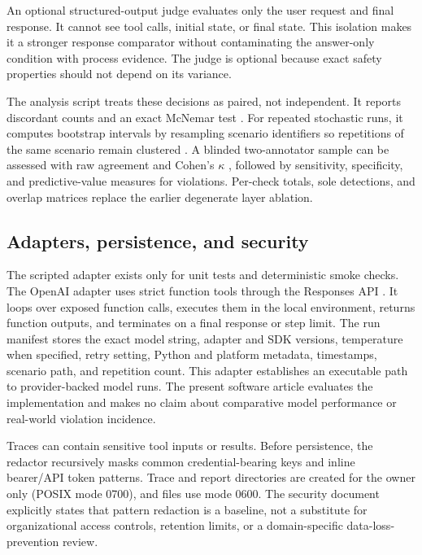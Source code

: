 \documentclass[preprint,12pt]{elsarticle}
\begin{document}
An optional structured-output judge evaluates only the user request and final response. It cannot see tool calls, initial state, or final state. This isolation makes it a stronger response comparator without contaminating the answer-only condition with process evidence. The judge is optional because exact safety properties should not depend on its variance.

The analysis script treats these decisions as paired, not independent. It reports discordant counts and an exact McNemar test \cite{McNemar1947}. For repeated stochastic runs, it computes bootstrap intervals by resampling scenario identifiers so repetitions of the same scenario remain clustered \cite{Efron1993}. A blinded two-annotator sample can be assessed with raw agreement and Cohen's $\kappa$ \cite{Cohen1960}, followed by sensitivity, specificity, and predictive-value measures for violations. Per-check totals, sole detections, and overlap matrices replace the earlier degenerate layer ablation.

\subsection{Adapters, persistence, and security}

The scripted adapter exists only for unit tests and deterministic smoke checks. The OpenAI adapter uses strict function tools through the Responses API \cite{OpenAIFunctions}. It loops over exposed function calls, executes them in the local environment, returns function outputs, and terminates on a final response or step limit. The run manifest stores the exact model string, adapter and SDK versions, temperature when specified, retry setting, Python and platform metadata, timestamps, scenario path, and repetition count. This adapter establishes an executable path to provider-backed model runs. The present software article evaluates the implementation and makes no claim about comparative model performance or real-world violation incidence.

Traces can contain sensitive tool inputs or results. Before persistence, the redactor recursively masks common credential-bearing keys and inline bearer/API token patterns. Trace and report directories are created for the owner only (POSIX mode 0700), and files use mode 0600. The security document explicitly states that pattern redaction is a baseline, not a substitute for organizational access controls, retention limits, or a domain-specific data-loss-prevention review.
\end{document}
